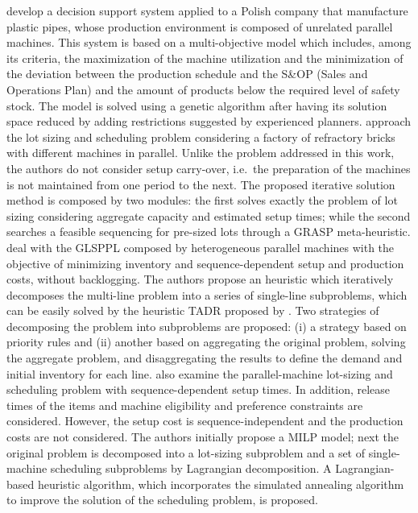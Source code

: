 \documentclass[11pt]{article}
\begin{document}
\cite{jozefowska2008optimization} develop a decision support system applied to a Polish company that manufacture plastic pipes, whose production environment is composed of unrelated parallel machines. This system is based on a multi-objective model which includes, among its criteria, the maximization of the machine utilization and the minimization of the deviation between the production schedule and the S\&OP (Sales and Operations Plan) and the amount of products below the required level of safety stock. The model is solved using a genetic algorithm after having its solution space reduced by adding restrictions suggested by experienced planners. \cite{mateus2010capacitated} approach the lot sizing and scheduling problem considering a factory of refractory bricks with different machines in parallel.  Unlike the problem addressed in this work, the authors do not consider setup carry-over, i.e.\ the preparation of the machines is not maintained from one period to the next. The proposed iterative solution method is composed by two modules: the first solves exactly the problem of lot sizing considering aggregate capacity and estimated setup times; while the second searches a feasible sequencing for pre-sized lots through a GRASP meta-heuristic. \cite{meyr2013decomposition} deal with the GLSPPL composed by heterogeneous parallel machines with the objective of minimizing inventory and sequence-dependent setup and production costs, without backlogging. The authors propose an heuristic which iteratively decomposes the multi-line problem into a series of single-line subproblems, which can be easily solved  by the heuristic TADR proposed by \cite{meyr2000simultaneous}. Two strategies of decomposing the problem into subproblems are proposed: (i) a strategy based on priority rules and (ii) another based on aggregating the original problem, solving the aggregate problem, and disaggregating the results to define the demand and initial inventory for each line. \cite{xiao2015hybrid} also examine the parallel-machine lot-sizing and scheduling problem with sequence-dependent setup times.  In addition, release times of the items and  machine eligibility and preference constraints are considered. However, the setup cost is sequence-independent and the production costs are not considered. The authors initially propose a MILP model; next  the original problem is decomposed into a lot-sizing subproblem and a set of single-machine scheduling subproblems by Lagrangian decomposition. A Lagrangian-based heuristic algorithm, which incorporates the simulated annealing algorithm to improve the solution of the scheduling problem, is proposed. 
\end{document}
